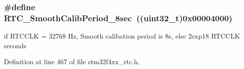 \hypertarget{group___r_t_c___smooth__calib__period___definitions_ga8a34f8b7e145649bad2ec36b69eccbd3}{
\subsubsection[{R\-T\-C\-\_\-\-Smooth\-Calib\-Period\-\_\-8sec}]{\setlength{\rightskip}{0pt plus 5cm}\#define R\-T\-C\-\_\-\-Smooth\-Calib\-Period\-\_\-8sec~((uint32\-\_\-t)0x00004000)}}\label{group___r_t_c___smooth__calib__period___definitions_ga8a34f8b7e145649bad2ec36b69eccbd3}
if R\-T\-C\-C\-L\-K = 32768 Hz, Smooth calibation period is 8s, else 2exp18 R\-T\-C\-C\-L\-K seconds 

Definition at line 467 of file stm32f4xx\-\_\-rtc.\-h.


